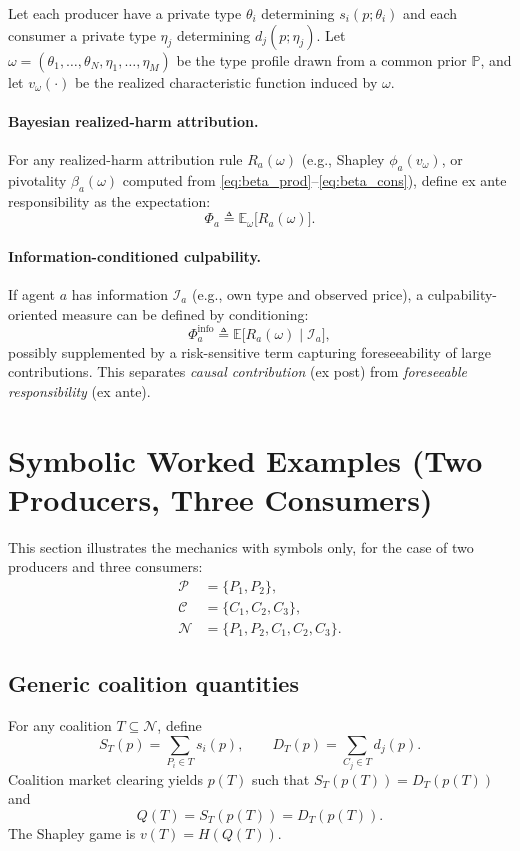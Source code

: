 \documentclass[journal, a4paper]{IEEEtran}
\begin{document}
Let each producer have a private type $\theta_i$ determining $s_i(p;\theta_i)$ and each consumer a private type $\eta_j$ determining $d_j(p;\eta_j)$. Let $\omega=(\theta_1,\dots,\theta_N,\eta_1,\dots,\eta_M)$ be the type profile drawn from a common prior $\mathbb{P}$, and let $v_\omega(\cdot)$ be the realized characteristic function induced by $\omega$.

\paragraph{Bayesian realized-harm attribution.}
For any realized-harm attribution rule $R_a(\omega)$ (e.g., Shapley $\phi_a(v_\omega)$, or pivotality $\beta_a(\omega)$ computed from \eqref{eq:beta_prod}--\eqref{eq:beta_cons}), define ex ante responsibility as the expectation:
\begin{equation}
\Phi_a \triangleq \mathbb{E}_\omega\big[R_a(\omega)\big].
\end{equation}

\paragraph{Information-conditioned culpability.}
If agent $a$ has information $\mathcal{I}_a$ (e.g., own type and observed price), a culpability-oriented measure can be defined by conditioning:
\begin{equation}
\Phi_a^{\text{info}} \triangleq \mathbb{E}\big[R_a(\omega)\mid \mathcal{I}_a\big],
\end{equation}
possibly supplemented by a risk-sensitive term capturing foreseeability of large contributions. This separates \emph{causal contribution} (ex post) from \emph{foreseeable responsibility} (ex ante).

\section{Symbolic Worked Examples (Two Producers, Three Consumers)}
This section illustrates the mechanics with symbols only, for the case of two producers and three consumers:
\begin{align}
\mathcal{P}&=\{P_1,P_2\},\\
\mathcal{C}&=\{C_1,C_2,C_3\},\\
\mathcal{N}&=\{P_1,P_2,C_1,C_2,C_3\}.
\end{align}

\subsection{Generic coalition quantities}
For any coalition $T\subseteq \mathcal{N}$, define
\begin{equation}
S_T(p)=\sum_{P_i\in T} s_i(p),\qquad
D_T(p)=\sum_{C_j\in T} d_j(p).
\end{equation}
Coalition market clearing yields $p(T)$ such that $S_T(p(T))=D_T(p(T))$ and
\begin{equation}
Q(T)=S_T(p(T))=D_T(p(T)).
\end{equation}
The Shapley game is $v(T)=H(Q(T))$.
\end{document}
